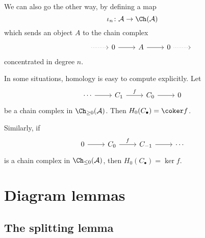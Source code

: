 \documentclass[main.tex]{subfiles}
\begin{document}
We can also go the other way, by defining a map
\begin{equation*}
  \iota_{n}\colon \mathcal{A} \to \Ch(\mathcal{A})
\end{equation*}
which sends an object $A$ to the chain complex
\begin{equation*}
  \begin{tikzcd}
    &{\ }
    \arrow[r, dotted]
    & 0
    \arrow[r]
    & A
    \arrow[r]
    & 0
    \arrow[r, dotted]
    &{\ }
  \end{tikzcd}
\end{equation*}
concentrated in degree $n$.

\begin{example}
  \label{eg:compute_homology_in_trivial_situation}
  In some situations, homology is easy to compute explicitly. Let
  \begin{equation*}
    \begin{tikzcd}
      \cdots
      \arrow[r]
      & C_{1}
      \arrow[r, "f"]
      & C_{0}
      \arrow[r]
      & 0
    \end{tikzcd}
  \end{equation*}
  be a chain complex in $\Ch_{\geq 0}(\mathcal{A})$. Then $H_{0}(C_{\bullet}) = \coker f$.

  Similarly, if
  \begin{equation*}
    \begin{tikzcd}
      0
      \arrow[r]
      & C_{0}
      \arrow[r, "f"]
      & C_{-1}
      \arrow[r]
      & \cdots
    \end{tikzcd}
  \end{equation*}
  is a chain complex in $\Ch_{\leq 0}(\mathcal{A})$, then $H_{0}(C_{\bullet}) = \ker f$.
\end{example}

\section{Diagram lemmas}
\label{sec:diagram_lemmas}

\subsection{The splitting lemma}
\label{ssc:the_splitting_lemma}
\end{document}
